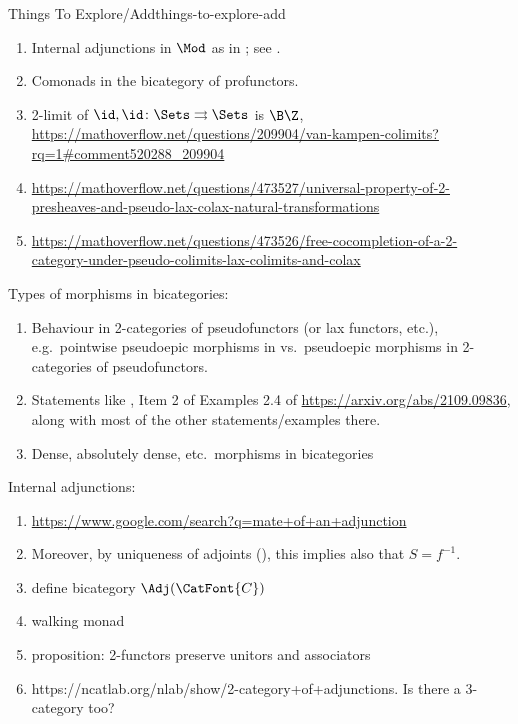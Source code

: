\begin{remark}{Things To Explore/Add}{things-to-explore-add}
\begin{enumerate}
        \item Internal adjunctions in $\Mod$ as in \cite[Section 6.3]{2-categories-book}; see \cite[Example 6.2.6]{2-categories-book}.
        \item Comonads in the bicategory of profunctors.
        \item 2-limit of $\id,\id\colon\Sets\rightrightarrows\Sets$ is $\B\Z$, \url{https://mathoverflow.net/questions/209904/van-kampen-colimits?rq=1#comment520288_209904}
        \item \url{https://mathoverflow.net/questions/473527/universal-property-of-2-presheaves-and-pseudo-lax-colax-natural-transformations}
        \item \url{https://mathoverflow.net/questions/473526/free-cocompletion-of-a-2-category-under-pseudo-colimits-lax-colimits-and-colax}
    \end{enumerate}
    Types of morphisms in bicategories:
    \begin{enumerate}
        \item Behaviour in 2-categories of pseudofunctors (or lax functors, etc.), e.g.\ pointwise pseudoepic morphisms in vs.\ pseudoepic morphisms in 2-categories of pseudofunctors.
        \item Statements like , Item 2 of Examples 2.4 of \url{https://arxiv.org/abs/2109.09836}, along with most of the other statements/examples there.
        \item Dense, absolutely dense, etc.\ morphisms in bicategories
    \end{enumerate}
    Internal adjunctions:
    \begin{enumerate}
        \item \url{https://www.google.com/search?q=mate+of+an+adjunction}
        \item Moreover, by uniqueness of adjoints (), this implies also that $S=f^{-1}$.
        \item define bicategory $\Adj(\CatFont{C})$
        \item walking monad
        \item proposition: 2-functors preserve unitors and associators
        \item https://ncatlab.org/nlab/show/2-category+of+adjunctions. Is there a 3-category too?

\end{enumerate}
\end{remark}
